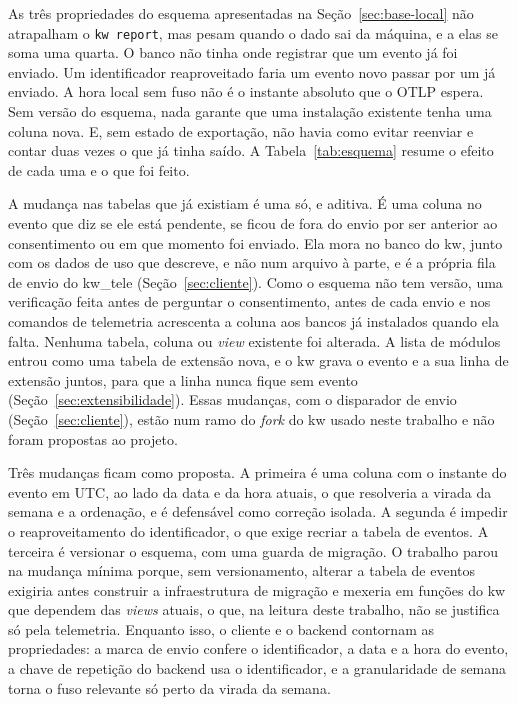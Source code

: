As três propriedades do esquema apresentadas na Seção~\ref{sec:base-local}
não atrapalham o \texttt{kw report}, mas pesam quando o dado sai da máquina,
e a elas se soma uma quarta. O banco não tinha onde registrar que um evento já
foi enviado. Um identificador reaproveitado faria um evento novo passar por um
já enviado. A hora local sem fuso não é o instante absoluto que o OTLP espera.
Sem versão do esquema, nada garante que uma instalação existente tenha uma
coluna nova. E, sem estado de exportação, não havia como evitar reenviar e
contar duas vezes o que já tinha saído. A Tabela~\ref{tab:esquema} resume o
efeito de cada uma e o que foi feito.



A mudança nas tabelas que já existiam é uma só, e aditiva. É uma coluna no
evento que diz se ele está pendente, se ficou de fora do envio por ser anterior ao
consentimento ou em que momento foi enviado. Ela mora no banco do kw, junto com
os dados de uso que descreve, e não num arquivo à parte, e é a própria fila de
envio do kw\_tele (Seção~\ref{sec:cliente}). Como o esquema não tem versão, uma
verificação feita antes de perguntar o consentimento, antes de cada envio e nos
comandos de telemetria acrescenta a coluna aos bancos já instalados quando ela
falta. Nenhuma tabela, coluna ou \textit{view} existente foi alterada. A lista
de módulos entrou como uma tabela de extensão nova, e o kw grava o evento e a
sua linha de extensão juntos, para que a linha nunca fique sem evento
(Seção~\ref{sec:extensibilidade}). Essas mudanças, com o disparador de envio
(Seção~\ref{sec:cliente}), estão num ramo do \textit{fork} do kw usado neste
trabalho e não foram propostas ao projeto.

Três mudanças ficam como proposta. A primeira é uma coluna com o instante do
evento em UTC, ao lado da data e da hora atuais, o que resolveria a virada da
semana e a ordenação, e é defensável como correção isolada. A segunda é
impedir o reaproveitamento do identificador, o que exige recriar a tabela de
eventos. A terceira é versionar o esquema, com uma guarda de migração. O
trabalho parou na mudança mínima porque, sem versionamento, alterar a tabela
de eventos exigiria antes construir a infraestrutura de migração e mexeria em
funções do kw que dependem das \textit{views} atuais, o que, na leitura deste
trabalho, não se justifica só pela telemetria. Enquanto isso, o cliente e o
backend contornam as propriedades: a marca de envio confere o identificador, a
data e a hora do evento, a chave de repetição do backend usa o identificador,
e a granularidade de semana torna o fuso relevante só perto da virada da
semana.

